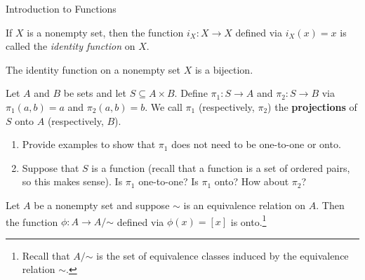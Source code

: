 \begin{section}{Introduction to Functions}
\begin{definition}
If $X$ is a nonempty set, then the function $i_X:X\to X$ defined via $i_X(x)=x$ is called the \emph{identity function} on $X$.
\end{definition}

\begin{theorem}
The identity function on a nonempty set $X$ is a bijection.
\end{theorem}

\begin{exercise}
Let $A$ and $B$ be sets and let $S\subseteq A\times B$.  Define $\pi_{1}:S\to A$ and $\pi_{2}:S\to B$ via $\pi_{1}(a,b)=a$ and $\pi_{2}(a,b)=b$.  We call $\pi_{1}$ (respectively, $\pi_{2}$) the \textbf{projections} of $S$ onto $A$ (respectively, $B$).
\begin{enumerate}[label=\textrm{(\alph*)}]
\item Provide examples to show that $\pi_{1}$ does not need to be one-to-one or onto.
\item Suppose that $S$ is a function (recall that a function is a set of ordered pairs, so this makes sense).  Is $\pi_{1}$ one-to-one? Is $\pi_{1}$ onto?  How about $\pi_{2}$?
\end{enumerate} 
\end{exercise}

\begin{theorem}
Let $A$ be a nonempty set and suppose $\sim$ is an equivalence relation on $A$. Then the function $\phi:A\to A/\mathord\sim$ defined via $\phi(x)=[x]$ is onto.\footnote{Recall that $A/\mathord\sim$ is the set of equivalence classes induced by the equivalence relation $\sim$.}
\end{theorem}

\end{section}